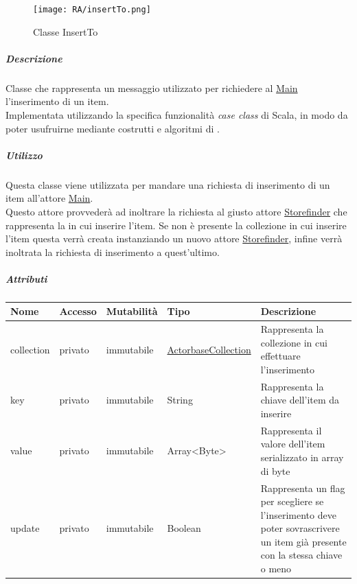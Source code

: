 \documentclass{scalatekids-article}
\begin{document}
\begin{figure}[H]
  \begin{center}
    \texttt{[image: RA/insertTo.png]}
    \caption{Classe InsertTo}
  \end{center}
\end{figure}

\subparagraph{Descrizione}
Classe che rappresenta un messaggio utilizzato per richiedere al
\hyperref[sec:actorbase::actorsystem::actors::main::Main]{Main} l'inserimento
di un item.\\Implementata utilizzando la specifica funzionalità
\textit{case class} di Scala,
in modo da poter usufruirne mediante costrutti e algoritmi di
.

\subparagraph{Utilizzo}
Questa classe viene utilizzata per mandare una richiesta di inserimento di un
item all'attore
\hyperref[sec:actorbase::actorsystem::actors::main::Main]{Main}.\\Questo attore
provvederà ad inoltrare la richiesta al giusto attore
\hyperref[sec:actorbase::actorsystem::actors::storefinder::Storefinder]{Storefinder}
che rappresenta la  in cui inserire l'item. Se non è presente
la collezione in cui inserire l'item questa verrà creata instanziando un nuovo
attore
\hyperref[sec:actorbase::actorsystem::actors::storefinder::Storefinder]{Storefinder},
infine verrà inoltrata la richiesta di inserimento a quest'ultimo.

\subparagraph{Attributi}
\begin{tabular}{| p{2cm} | p{1.5cm} | p{2cm} | p{3cm} | p{8.5cm} |}
  \hline
  Nome & Accesso & Mutabilità & Tipo & Descrizione\\
  \hline
  collection & privato & immutabile & \hyperref[sec:actorbase::actorsystem::utils::ActorbaseCollection]{ActorbaseCollection} & Rappresenta la collezione in cui effettuare l'inserimento \\
  \hline
  key & privato & immutabile & String & Rappresenta la chiave dell'item da inserire\\
  \hline
  value & privato & immutabile & Array<Byte> & Rappresenta il valore dell'item serializzato in array di byte\\
  \hline
  update & privato & immutabile & Boolean & Rappresenta un flag per scegliere se l'inserimento deve poter sovrascrivere un item già presente con la stessa chiave o meno\\
  \hline
\end{tabular}
\end{document}
